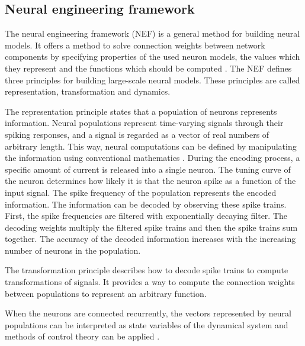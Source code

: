 \subsection{Neural engineering framework}
The neural engineering framework (NEF) is a general method for building neural models. It offers a method to solve connection weights between network components by specifying properties of the used neuron models, the values which they represent and the functions which should be computed \cite{stewartTechnicalOverviewNeural2012}. The NEF defines three principles for building large-scale neural models. These principles are called representation, transformation and dynamics. \par
The representation principle states that a population of neurons represents information. Neural populations represent time-varying signals through their spiking responses, and a signal is regarded as a vector of real numbers of arbitrary length.  This way, neural computations can be defined by manipulating the information using conventional mathematics \cite{bekolayNengoPythonTool2014}. During the encoding process, a specific amount of current is released into a single neuron. The tuning curve of the neuron determines how likely it is that the neuron spike as a function of the input signal. The spike frequency of the population represents the encoded information. The information can be decoded by observing these spike trains. First, the spike frequencies are filtered with exponentially decaying filter. The decoding weights multiply the filtered spike trains and then the spike trains sum together. The accuracy of the decoded information increases with the increasing number of neurons in the population. \par
The transformation principle describes how to decode spike trains to compute transformations of signals. It provides a way to compute the connection weights between populations to represent an arbitrary function. \par
When the neurons are connected recurrently, the vectors represented by neural populations can be interpreted as state variables of the dynamical system and methods of control theory can be applied \cite{bekolayNengoPythonTool2014}.

